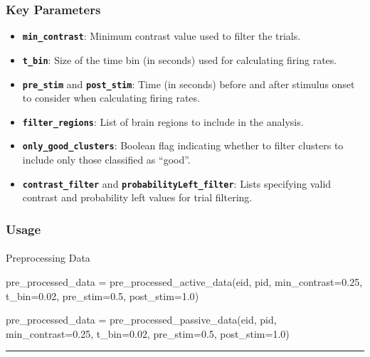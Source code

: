 \documentclass[
  letterpaper,
  DIV=11,
  numbers=noendperiod]{scrartcl}
\makeatletter
\let\oldparagraph\paragraph
\renewcommand{\paragraph}{
    \@ifstar
      \xxxParagraphStar
      \xxxParagraphNoStar
  }
\newcommand{\xxxParagraphStar}[1]{\oldparagraph*{#1}\mbox{}}
\newcommand{\xxxParagraphNoStar}[1]{\oldparagraph{#1}\mbox{}}
\newenvironment{Shaded}{\begin{snugshade}}{\end{snugshade}}
\newcommand{\FloatTok}[1]{\textcolor[rgb]{0.68,0.00,0.00}{#1}}
\newcommand{\NormalTok}[1]{\textcolor[rgb]{0.00,0.23,0.31}{#1}}
\newcommand{\OperatorTok}[1]{\textcolor[rgb]{0.37,0.37,0.37}{#1}}
\providecommand{\tightlist}{%
  \setlength{\itemsep}{0pt}\setlength{\parskip}{0pt}}\usepackage{longtable,booktabs,array}
\makeatother
\begin{document}
\subsubsection{Key Parameters}\label{key-parameters-1}

\begin{itemize}
\tightlist
\item
  \textbf{\texttt{min\_contrast}}: Minimum contrast value used to filter
  the trials.
\item
  \textbf{\texttt{t\_bin}}: Size of the time bin (in seconds) used for
  calculating firing rates.
\item
  \textbf{\texttt{pre\_stim}} and \textbf{\texttt{post\_stim}}: Time (in
  seconds) before and after stimulus onset to consider when calculating
  firing rates.
\item
  \textbf{\texttt{filter\_regions}}: List of brain regions to include in
  the analysis.
\item
  \textbf{\texttt{only\_good\_clusters}}: Boolean flag indicating
  whether to filter clusters to include only those classified as
  ``good''.
\item
  \textbf{\texttt{contrast\_filter}} and
  \textbf{\texttt{probabilityLeft\_filter}}: Lists specifying valid
  contrast and probability left values for trial filtering.
\end{itemize}

\subsubsection{Usage}\label{usage-1}

\paragraph{Preprocessing Data}\label{preprocessing-data-1}

\begin{Shaded}
\begin{Highlighting}[]
\NormalTok{pre\_processed\_data }\OperatorTok{=}\NormalTok{ pre\_processed\_active\_data(eid, pid, min\_contrast}\OperatorTok{=}\FloatTok{0.25}\NormalTok{, t\_bin}\OperatorTok{=}\FloatTok{0.02}\NormalTok{, pre\_stim}\OperatorTok{=}\FloatTok{0.5}\NormalTok{, post\_stim}\OperatorTok{=}\FloatTok{1.0}\NormalTok{)}

\NormalTok{pre\_processed\_data }\OperatorTok{=}\NormalTok{ pre\_processed\_passive\_data(eid, pid, min\_contrast}\OperatorTok{=}\FloatTok{0.25}\NormalTok{, t\_bin}\OperatorTok{=}\FloatTok{0.02}\NormalTok{, pre\_stim}\OperatorTok{=}\FloatTok{0.5}\NormalTok{, post\_stim}\OperatorTok{=}\FloatTok{1.0}\NormalTok{)}
\end{Highlighting}
\end{Shaded}

\begin{center}\rule{0.5\linewidth}{0.5pt}\end{center}
\end{document}
